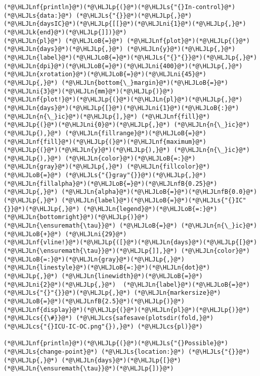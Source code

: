 \documentclass[12pt,a4paper]{article}
\newcommand{\HLJLk}[1]{\textcolor[RGB]{148,91,176}{\textbf{#1}}}
\newcommand{\HLJLn}[1]{#1}
\newcommand{\HLJLnf}[1]{\textcolor[RGB]{66,102,213}{#1}}
\newcommand{\HLJLs}[1]{\textcolor[RGB]{201,61,57}{#1}}
\newcommand{\HLJLnfB}[1]{\textcolor[RGB]{59,151,46}{#1}}
\newcommand{\HLJLni}[1]{\textcolor[RGB]{59,151,46}{#1}}
\newcommand{\HLJLoB}[1]{\textcolor[RGB]{102,102,102}{\textbf{#1}}}
\newcommand{\HLJLp}[1]{#1}
\newcommand{\HLJLcs}[1]{\textcolor[RGB]{153,153,119}{\textit{#1}}}
\begin{document}
\begin{lstlisting}
(*@\HLJLnf{println}@*)(*@\HLJLp{(}@*)(*@\HLJLs{"{}In-control}@*) (*@\HLJLs{data:}@*) (*@\HLJLs{"{}}@*)(*@\HLJLp{,}@*) (*@\HLJLn{daysIC}@*)(*@\HLJLp{[[}@*)(*@\HLJLni{1}@*)(*@\HLJLp{,}@*) (*@\HLJLk{end}@*)(*@\HLJLp{]])}@*)
(*@\HLJLn{pl}@*) (*@\HLJLoB{=}@*) (*@\HLJLnf{plot}@*)(*@\HLJLp{(}@*)(*@\HLJLn{days}@*)(*@\HLJLp{,}@*) (*@\HLJLn{y}@*)(*@\HLJLp{,}@*) (*@\HLJLn{label}@*)(*@\HLJLoB{=}@*)(*@\HLJLs{"{}"{}}@*)(*@\HLJLp{,}@*) (*@\HLJLn{dpi}@*)(*@\HLJLoB{=}@*)(*@\HLJLni{400}@*)(*@\HLJLp{,}@*) (*@\HLJLn{xrotation}@*)(*@\HLJLoB{=}@*)(*@\HLJLni{45}@*)(*@\HLJLp{,}@*) (*@\HLJLn{bottom{\_}margin}@*)(*@\HLJLoB{=}@*)(*@\HLJLni{3}@*)(*@\HLJLn{mm}@*)(*@\HLJLp{)}@*)
(*@\HLJLnf{plot!}@*)(*@\HLJLp{(}@*)(*@\HLJLn{pl}@*)(*@\HLJLp{,}@*) (*@\HLJLn{days}@*)(*@\HLJLp{[}@*)(*@\HLJLni{1}@*)(*@\HLJLoB{:}@*)(*@\HLJLn{n{\_}ic}@*)(*@\HLJLp{],}@*) (*@\HLJLnf{fill}@*)(*@\HLJLp{(}@*)(*@\HLJLni{0}@*)(*@\HLJLp{,}@*) (*@\HLJLn{n{\_}ic}@*)(*@\HLJLp{),}@*) (*@\HLJLn{fillrange}@*)(*@\HLJLoB{=}@*)(*@\HLJLnf{fill}@*)(*@\HLJLp{(}@*)(*@\HLJLnf{maximum}@*)(*@\HLJLp{(}@*)(*@\HLJLn{y}@*)(*@\HLJLp{),}@*) (*@\HLJLn{n{\_}ic}@*)(*@\HLJLp{),}@*) (*@\HLJLn{color}@*)(*@\HLJLoB{=:}@*)(*@\HLJLn{gray}@*)(*@\HLJLp{,}@*) (*@\HLJLn{fillcolor}@*) (*@\HLJLoB{=}@*) (*@\HLJLs{"{}gray"{}}@*)(*@\HLJLp{,}@*) (*@\HLJLn{fillalpha}@*)(*@\HLJLoB{=}@*)(*@\HLJLnfB{0.25}@*)(*@\HLJLp{,}@*) (*@\HLJLn{alpha}@*)(*@\HLJLoB{=}@*)(*@\HLJLnfB{0.0}@*)(*@\HLJLp{,}@*) (*@\HLJLn{label}@*)(*@\HLJLoB{=}@*)(*@\HLJLs{"{}IC"{}}@*)(*@\HLJLp{,}@*) (*@\HLJLn{legend}@*)(*@\HLJLoB{=:}@*)(*@\HLJLn{bottomright}@*)(*@\HLJLp{)}@*)
(*@\HLJLn{\ensuremath{\tau}}@*) (*@\HLJLoB{=}@*) (*@\HLJLn{n{\_}ic}@*) (*@\HLJLoB{+}@*) (*@\HLJLni{29}@*)
(*@\HLJLnf{vline!}@*)(*@\HLJLp{([}@*)(*@\HLJLn{days}@*)(*@\HLJLp{[}@*)(*@\HLJLn{\ensuremath{\tau}}@*)(*@\HLJLp{]],}@*) (*@\HLJLn{color}@*)(*@\HLJLoB{=:}@*)(*@\HLJLn{gray}@*)(*@\HLJLp{,}@*) (*@\HLJLn{linestyle}@*)(*@\HLJLoB{=:}@*)(*@\HLJLn{dot}@*)(*@\HLJLp{,}@*) (*@\HLJLn{linewidth}@*)(*@\HLJLoB{=}@*)(*@\HLJLni{2}@*)(*@\HLJLp{,}@*)  (*@\HLJLn{label}@*)(*@\HLJLoB{=}@*)(*@\HLJLs{"{}"{}}@*)(*@\HLJLp{,}@*) (*@\HLJLn{markersize}@*)(*@\HLJLoB{=}@*)(*@\HLJLnfB{2.5}@*)(*@\HLJLp{)}@*)
(*@\HLJLnf{display}@*)(*@\HLJLp{(}@*)(*@\HLJLn{pl}@*)(*@\HLJLp{)}@*)
(*@\HLJLcs{{\#}}@*) (*@\HLJLcs{safesave(plotsdir(fold,}@*) (*@\HLJLcs{"{}ICU-IC-OC.png"{}),}@*) (*@\HLJLcs{pl)}@*)

(*@\HLJLnf{println}@*)(*@\HLJLp{(}@*)(*@\HLJLs{"{}Possible}@*) (*@\HLJLs{change-point}@*) (*@\HLJLs{location:}@*) (*@\HLJLs{"{}}@*)(*@\HLJLp{,}@*) (*@\HLJLn{days}@*)(*@\HLJLp{[}@*)(*@\HLJLn{\ensuremath{\tau}}@*)(*@\HLJLp{])}@*)
\end{lstlisting}
\end{document}
